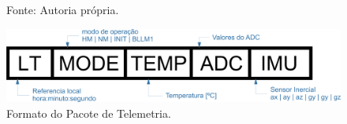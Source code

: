 \begin{figure}[h]
\footnotesize{	
	\centering
			\centering
	\footnotesize{Fonte: Autoria própria.}
	
	\includegraphics[keepaspectratio=true,scale=0.5]{figuras/telemetryPacket.png}
	\caption{Formato do Pacote de Telemetria.}
	\label{telemetryPacket}
}
\end{figure}
\FloatBarrier

